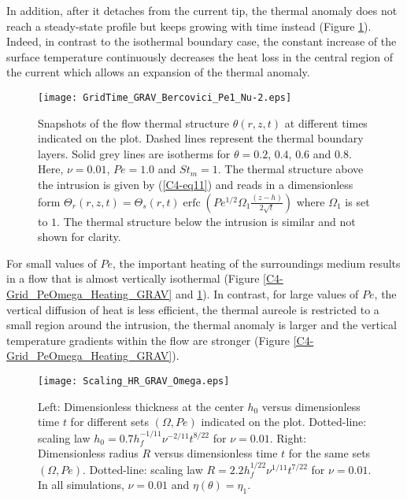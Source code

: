 In  addition, after  it detaches  from  the current  tip, the  thermal
anomaly does not  reach a steady-state profile but  keeps growing with
time instead (Figure \ref{C4-Grid_TIME_GRAV}).  Indeed, in contrast to
the isothermal  boundary case,  the constant  increase of  the surface
temperature continuously decreases the heat loss in the central region
of the current which allows an expansion of the thermal anomaly.
\begin{figure}[h!]
  \begin{center}
    \graphicspath{ {/Users/thorey/Documents/These/Projet/Refroidissement/Skin_Model/Figure/Figure_Heating/} }
    \texttt{[image: GridTime\_GRAV\_Bercovici\_Pe1\_Nu-2.eps]}
    \caption{Snapshots of  the flow thermal  structure $\theta(r,z,t)$
      at  different  times  indicated   on  the  plot.   Dashed  lines
      represent  the thermal  boundary  layers. Solid  grey lines  are
      isotherms for  $\theta =  0.2$, $0.4$,  $0.6$ and  $0.8$.  Here,
      $\nu=0.01$,  $Pe =1.0$  and $St_m  = 1$.  The thermal  structure
      above the intrusion  is given by (\ref{C4-eq11}) and  reads in a
      dimensionless                                               form
      $\Theta_r(r,z,t)=\Theta_s(r,t)\operatorname{erfc}{\left(Pe^{1/2}\Omega_1\frac{(z-h)}{2\sqrt{t}}\right)}$
      where $\Omega_1$ is set to  $1$. The thermal structure below the
      intrusion is similar and not shown for clarity.}
    \label{C4-Grid_TIME_GRAV}
  \end{center}
\end{figure}

For small  values of $Pe$,  the important heating of  the surroundings
medium results in a flow  that is almost vertically isothermal (Figure
\ref{C4-Grid_PeOmega_Heating_GRAV}  and \ref{C4-Grid_TIME_GRAV}).   In
contrast, for large values of $Pe$,  the vertical diffusion of heat is
less efficient,  the thermal aureole  is restricted to a  small region
around the intrusion,  the thermal anomaly is larger  and the vertical
temperature   gradients   within   the  flow   are   stronger   (Figure
\ref{C4-Grid_PeOmega_Heating_GRAV}).
\begin{figure}[h!]
  \begin{center}
    \graphicspath{ {/Users/thorey/Documents/These/Projet/Refroidissement/Skin_Model/Figure/Figure_Heating/} }
    \texttt{[image: Scaling\_HR\_GRAV\_Omega.eps]}
    \caption{Left: Dimensionless thickness at  the center $h_0$ versus
      dimensionless   time  $t$   for  different   sets  $(\Omega,Pe)$
      indicated    on   the    plot.     Dotted-line:   scaling    law
      $h_0=  0.7h_f^{-1/11}\nu^{-2/11}t^{8/22}$  for   $\nu  =  0.01$.
      Right: Dimensionless  radius $R$  versus dimensionless  time $t$
      for  the  same  sets $(\Omega,Pe)$.   Dotted-line:  scaling  law
      $R= 2.2h_f^{1/22}\nu^{1/11}t^{7/22}$  for $\nu = 0.01$.   In all
      simulations, $\nu=0.01$ and $\eta(\theta)=\eta_1$.}
    \label{C4-Scaling_HR_GRAV_Omega}
  \end{center}
\end{figure}


